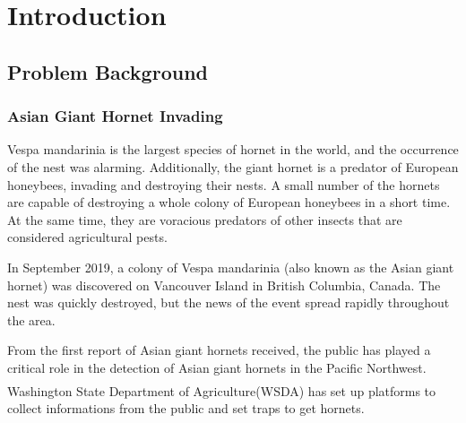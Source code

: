\documentclass[12pt]{article}
\newcommand{\upcite}[1]{\textsuperscript{\textsuperscript{\cite{#1}}}}
\begin{document}
\clearpage
\pagestyle{fancy}
\tableofcontents 
\newpage
\setcounter{page}{1}






\section{Introduction}
\subsection{Problem Background}
\subsubsection{Asian Giant Hornet Invading  }
Vespa mandarinia is the largest species of hornet in the world, and the occurrence of the nest was alarming. Additionally, the giant hornet is a predator of European honeybees, invading and destroying their nests. A small number of the hornets are capable of destroying a whole colony of European honeybees in a short time. At the same time, they are voracious predators of other insects that are considered agricultural pests.

In September 2019, a colony of Vespa mandarinia (also known as the Asian giant hornet) was discovered on Vancouver Island in British Columbia, Canada. The nest was quickly destroyed, but the news of the event spread rapidly throughout the area. 

From the first report of Asian giant hornets received, the public has played a critical role in the detection of Asian giant hornets in the Pacific Northwest. Washington State Department of Agriculture(WSDA)  has set up platforms\upcite{fb} to collect informations from the  public and set traps to get hornets.  
 
\end{document}
